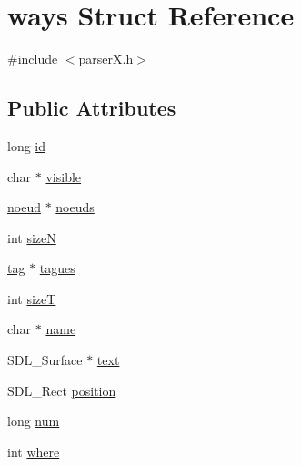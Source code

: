 \hypertarget{structways}{\section{ways Struct Reference}
\label{structways}
}


{\ttfamily \#include $<$parser\-X.\-h$>$}

\subsection*{Public Attributes}
\begin{DoxyCompactItemize}
\item 
long \hyperlink{structways_a10c2d14355f8d8e21d51869cdd4e456c}{id}
\item 
char $\ast$ \hyperlink{structways_ad404ba6377810c5470ee3c2dd40f62bd}{visible}
\item 
\hyperlink{structnoeud}{noeud} $\ast$ \hyperlink{structways_a3d3a53dc916fd3049e5564013e0c4a38}{noeuds}
\item 
int \hyperlink{structways_a6f011f2876fc323ebe85ac08d2b272cc}{size\-N}
\item 
\hyperlink{structtag}{tag} $\ast$ \hyperlink{structways_a789ab9774dfad06f39c0b214a54525f5}{tagues}
\item 
int \hyperlink{structways_a1205c87ee82c834f29135381991e5070}{size\-T}
\item 
char $\ast$ \hyperlink{structways_ad15396786280ed888a09c62ca08b8e02}{name}
\item 
S\-D\-L\-\_\-\-Surface $\ast$ \hyperlink{structways_a6f4b44b77c63fe852b01f117647fae5e}{text}
\item 
S\-D\-L\-\_\-\-Rect \hyperlink{structways_ae0cc4341e9f2737c265d26ac47d567d5}{position}
\item 
long \hyperlink{structways_ae3cb2ed1694343a718b7bd67c0cb87bc}{num}
\item 
int \hyperlink{structways_aeab0f5f4b7024e1c4070f2b4551ac656}{where}
\end{DoxyCompactItemize}


